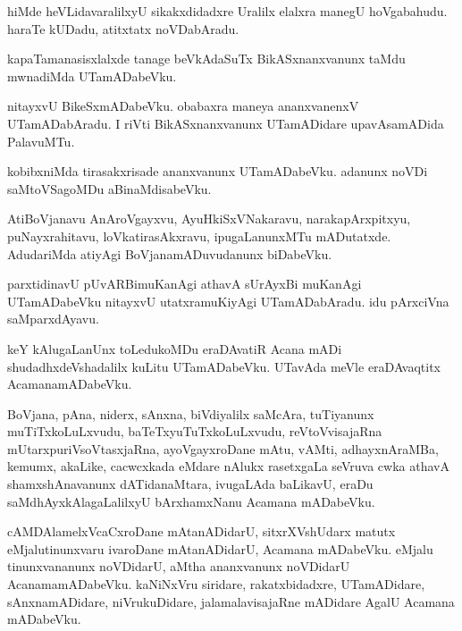 \documentclass{article}
\begin{document}
\begin{mn}
hiMde heVLidavaralilxyU sikakxdidadxre Uralilx elalxra manegU hoVgabahudu. haraTe kUDadu, 
atitxtatx noVDabAradu.
\end{mn}

\begin{mn}
kapaTamanasisxlalxde tanage beVkAdaSuTx BikASxnanxvanunx taMdu mwnadiMda UTamADabeVku.
\end{mn}

\begin{mn}
nitayxvU BikeSxmADabeVku. obabaxra maneya ananxvanenxV UTamADabAradu. I riVti 
BikASxnanxvanunx UTamADidare upavAsamADida PalavuMTu.
\end{mn}

\begin{mn}
kobibxniMda tirasakxrisade ananxvanunx UTamADabeVku. adanunx noVDi saMtoVSagoMDu 
aBinaMdisabeVku.
\end{mn}

\begin{mn}
AtiBoVjanavu AnAroVgayxvu, AyuHkiSxVNakaravu, narakapArxpitxyu, puNayxrahitavu, 
loVkatirasAkxravu, ipugaLanunxMTu mADutatxde. AdudariMda atiyAgi BoVjanamADuvudanunx 
biDabeVku.
\end{mn}

\begin{mn}
parxtidinavU pUvARBimuKanAgi athavA sUrAyxBi muKanAgi UTamADabeVku nitayxvU utatxramuKiyAgi
UTamADabAradu. idu pArxciVna saMparxdAyavu.
\end{mn}

\begin{mn}
keY kAlugaLanUnx toLedukoMDu eraDAvatiR Acana mADi shudadhxdeVshadalilx kuLitu UTamADabeVku.
UTavAda meVle eraDAvaqtitx AcamanamADabeVku. 
\end{mn}


\begin{mn}
BoVjana, pAna, niderx, sAnxna, biVdiyalilx saMcAra, tuTiyanunx muTiTxkoLuLxvudu, 
baTeTxyuTuTxkoLuLxvudu, reVtoVvisajaRna mUtarxpuriVsoVtasxjaRna, ayoVgayxroDane mAtu, vAMti, 
adhayxnAraMBa, kemumx, akaLike, cacwcxkada eMdare nAlukx rasetxgaLa seVruva cwka athavA 
shamxshAnavanunx dATidanaMtara, ivugaLAda baLikavU, eraDu saMdhAyxkAlagaLalilxyU bArxhamxNanu
Acamana mADabeVku.
\end{mn}

\begin{mn}
cAMDAlamelxVcaCxroDane mAtanADidarU, sitxrXVshUdarx matutx eMjalutinunxvaru ivaroDane 
mAtanADidarU, Acamana mADabeVku. eMjalu tinunxvananunx noVDidarU, aMtha ananxvanunx noVDidarU 
AcanamamADabeVku. kaNiNxVru siridare, rakatxbidadxre, UTamADidare, sAnxnamADidare, 
niVrukuDidare, jalamalavisajaRne mADidare AgalU Acamana mADabeVku.
\end{mn}
\end{document}
